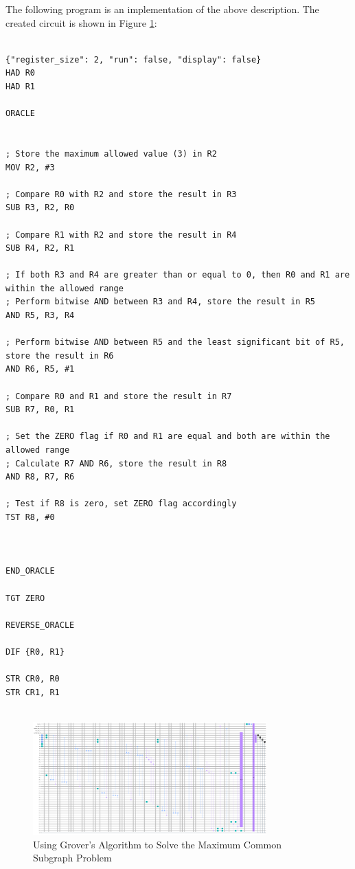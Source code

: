 The following program is an implementation of the above description. The created circuit is shown in Figure \ref{fig:Maximum_Common_Subgraph}:

\begin{lstlisting}

{"register_size": 2, "run": false, "display": false}
HAD R0
HAD R1

ORACLE


; Store the maximum allowed value (3) in R2
MOV R2, #3

; Compare R0 with R2 and store the result in R3
SUB R3, R2, R0

; Compare R1 with R2 and store the result in R4
SUB R4, R2, R1

; If both R3 and R4 are greater than or equal to 0, then R0 and R1 are within the allowed range
; Perform bitwise AND between R3 and R4, store the result in R5
AND R5, R3, R4

; Perform bitwise AND between R5 and the least significant bit of R5, store the result in R6
AND R6, R5, #1

; Compare R0 and R1 and store the result in R7
SUB R7, R0, R1

; Set the ZERO flag if R0 and R1 are equal and both are within the allowed range
; Calculate R7 AND R6, store the result in R8
AND R8, R7, R6

; Test if R8 is zero, set ZERO flag accordingly
TST R8, #0



END_ORACLE

TGT ZERO

REVERSE_ORACLE

DIF {R0, R1}

STR CR0, R0
STR CR1, R1


\end{lstlisting}

\begin{figure}[htp]
    \centering
    \includegraphics[width=9cm]{Figures/Maximum_Common_Subgraph_circuit.png}
    \caption{Using Grover's Algorithm to Solve the Maximum Common Subgraph Problem}
    \label{fig:Maximum_Common_Subgraph}
\end{figure}

